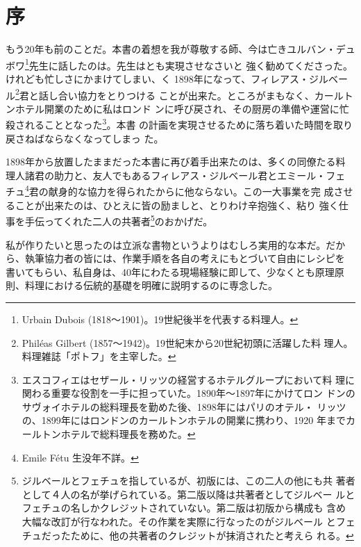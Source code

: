 \hypertarget{ux5e8f}{%
\chapter{序}\label{ux5e8f}}

もう20年も前のことだ。本書の着想を我が尊敬する師、今は亡きユルバン・デュ
ボワ\footnote{Urbain Dubois (1818〜1901)。19世紀後半を代表する料理人。}先生に話したのは。先生はとも実現させなさいと
強く勧めてくださった。けれども忙しさにかまけてしまい、く
1898年になって、フィレアス・ジルベール\footnote{Philéas Gilbert
  (1857〜1942)。19世紀末から20世紀初頭に活躍した料
  理人。料理雑誌「ポトフ」を主宰した。}君と話し合い協力をとりつける
ことが出来た。ところがまもなく、カールトンホテル開業のために私はロンド
ンに呼び戻され、その厨房の準備や運営に忙殺されることとなった\footnote{エスコフィエはセザール・リッツの経営するホテルグループにおいて料
  理に関わる重要な役割を一手に担っていた。1890年〜1897年にかけてロン
  ドンのサヴォイホテルの総料理長を勤めた後、1898年にはパリのオテル・
  リッツの、1899年にはロンドンのカールトンホテルの開業に携わり、1920
  年までカールトンホテルで総料理長を務めた。}。本書
の計画を実現させるために落ち着いた時間を取り戻さねばならなくなってしまっ
た。

1898年から放置したままだった本書に再び着手出来たのは、多くの同僚たる料
理人諸君の助力と、友人でもあるフィレアス・ジルベール君とエミール・フェ
チュ\footnote{Emile Fétu 生没年不詳。}君の献身的な協力を得られたからに他ならない。この一大事業を完
成させることが出来たのは、ひとえに皆の励ましと、とりわけ辛抱強く、粘り
強く仕事を手伝ってくれた二人の共著者\footnote{ジルベールとフェチュを指しているが、初版には、この二人の他にも共
  著者として４人の名が挙げられている。第二版以降は共著者としてジルベー
  ルとフェチュの名しかクレジットされていない。第二版は初版から構成も
  含め大幅な改訂が行なわれた。その作業を実際に行なったのがジルベール
  とフェチュだったために、他の共著者のクレジットが抹消されたと考えら
  れる。}のおかげだ。

私が作りたいと思ったのは立派な書物というよりはむしろ実用的な本だ。だか
ら、執筆協力者の皆には、作業手順を各自の考えにもとづいて自由にレシピを
書いてもらい、私自身は、40年にわたる現場経験に即して、少なくとも原理原
則、料理における伝統的基礎を明確に説明するのに専念した。


